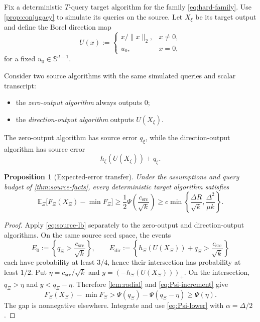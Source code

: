 \documentclass[11pt]{article}
\newcommand{\E}{\mathbb{E}}
\newcommand{\Sph}{\mathbb{S}}
\newcommand{\norm}[1]{\lVert #1\rVert_2}
\theoremstyle{plain}
\newtheorem{proposition}[proposition]{Proposition}
\theoremstyle{definition}
\begin{document}
Fix a deterministic $T$-query target algorithm for the family \eqref{eq:hard-family}.  Use \cref{prop:conjugacy} to simulate its queries on the source.  Let $X_\xi$ be its target output and define the Borel direction map
\[
   U(x):=
   \begin{cases}
      x/\norm{x},&x\ne0,\\
      u_0,&x=0,
   \end{cases}
\]
for a fixed $u_0\in\Sph^{d-1}$.

Consider two source algorithms with the same simulated queries and scalar transcript:
\begin{itemize}[leftmargin=2em]
\item the \emph{zero-output algorithm} always outputs $0$;
\item the \emph{direction-output algorithm} outputs $U(X_\xi)$.
\end{itemize}
The zero-output algorithm has source error $q_\xi$, while the direction-output algorithm has source error
\[
   h_\xi(U(X_\xi))+q_\xi.
\]

\begin{proposition}[Expected-error transfer]\label{prop:expected-transfer}
Under the assumptions and query budget of \cref{thm:source-facts}, every deterministic target algorithm satisfies
\begin{equation}\label{eq:expected-fixed-budget}
  \E_\Xi\bigl[F_\Xi(X_\Xi)-\min F_\Xi\bigr]
  \ge \frac12\Psi\!\left(\frac{c_{\mathrm{src}}}{\sqrt k}\right)
  \ge c\min\left\{\frac{\Delta R}{\sqrt k},
                    \frac{\Delta^2}{\mu k}\right\}.
\end{equation}
\end{proposition}

\begin{proof}
Apply \eqref{eq:source-lb} separately to the zero-output and direction-output algorithms.  On the same source seed space, the events
\[
  E_0:=\left\{q_\Xi>\frac{c_{\mathrm{src}}}{\sqrt k}\right\},
  \qquad
  E_{\mathrm{dir}}:=\left\{
       h_\Xi(U(X_\Xi))+q_\Xi>\frac{c_{\mathrm{src}}}{\sqrt k}
       \right\}
\]
each have probability at least $3/4$, hence their intersection has probability at least $1/2$.  Put $\eta=c_{\mathrm{src}}/\sqrt k$ and $y=(-h_\Xi(U(X_\Xi)))_+$.  On the intersection, $q_\Xi>\eta$ and $y<q_\Xi-\eta$.  Therefore \cref{lem:radial} and \eqref{eq:Psi-increment} give
\[
  F_\Xi(X_\Xi)-\min F_\Xi
  >\Psi(q_\Xi)-\Psi(q_\Xi-\eta)
  \ge\Psi(\eta).
\]
The gap is nonnegative elsewhere.  Integrate and use \eqref{eq:Psi-lower} with $\alpha=\Delta/2$.
\end{proof}
\end{document}

